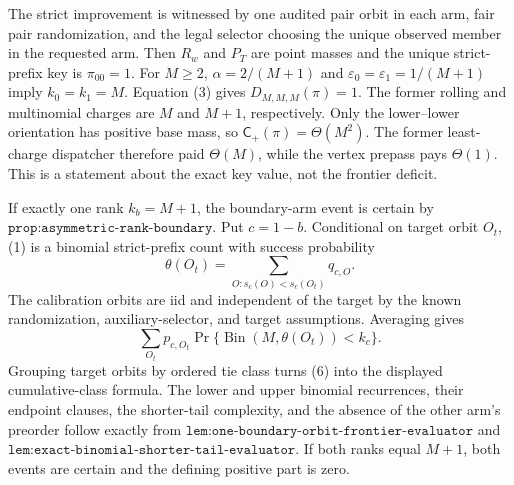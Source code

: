 The strict improvement is witnessed by one audited pair orbit in each arm, fair pair randomization, and the legal selector choosing the unique observed member in the requested arm. Then \(R_w\) and \(P_T\) are point masses and the unique strict-prefix key is \(\pi_{00}=1\). For \(M\ge2\), \(\alpha=2/(M+1)\) and \(\varepsilon_0=\varepsilon_1=1/(M+1)\) imply \(k_0=k_1=M\). Equation (3) gives \(D_{M,M,M}(\pi)=1\). The former rolling and multinomial charges are \(M\) and \(M+1\), respectively. Only the lower--lower orientation has positive base mass, so \(\mathsf C_+(\pi)=\Theta(M^2)\). The former least-charge dispatcher therefore paid \(\Theta(M)\), while the vertex prepass pays \(\Theta(1)\). This is a statement about the exact key value, not the frontier deficit.

If exactly one rank \(k_b=M+1\), the boundary-arm event is certain by \(\texttt{prop:asymmetric-rank-boundary}\). Put \(c=1-b\). Conditional on target orbit \(O_t\), (1) is a binomial strict-prefix count with success probability
\[
\theta(O_t)=\sum_{O:s_c(O)<s_c(O_t)}q_{c,O}.
\]
The calibration orbits are iid and independent of the target by the known randomization, auxiliary-selector, and target assumptions. Averaging gives
\[
\sum_{O_t}p_{c,O_t}\Pr\{\operatorname{Bin}(M,\theta(O_t))<k_c\}.
\tag{6}
\]
Grouping target orbits by ordered tie class turns (6) into the displayed cumulative-class formula. The lower and upper binomial recurrences, their endpoint clauses, the shorter-tail complexity, and the absence of the other arm's preorder follow exactly from \(\texttt{lem:one-boundary-orbit-frontier-evaluator}\) and \(\texttt{lem:exact-binomial-shorter-tail-evaluator}\). If both ranks equal \(M+1\), both events are certain and the defining positive part is zero.

